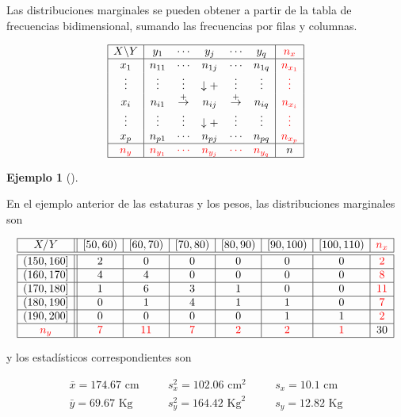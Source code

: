 \documentclass[
  spanish,
  a4paper,
]{scrreport}
\theoremstyle{plain}
\theoremstyle{definition}
\newtheorem{example}{Ejemplo}[chapter]
\theoremstyle{definition}
\theoremstyle{remark}
\begin{document}
Las distribuciones marginales se pueden obtener a partir de la tabla de
frecuencias bidimensional, sumando las frecuencias por filas y columnas.

\[
\begin{array}{|c|ccccc|c|}
\hline
X\backslash Y & y_1 & \cdots & y_j & \cdots & y_q & \color{red}{n_x}\\
\hline
x_1 & n_{11} & \cdots & n_{1j} & \cdots & n_{1q} & \color{red}{n_{x_1}}\\
\vdots & \vdots & \vdots & \downarrow + & \vdots & \vdots & \color{red}{\vdots} \\
x_i & n_{i1} & \stackrel{+}{\rightarrow} & n_{ij} & \stackrel{+}{\rightarrow} & n_{iq} & \color{red}{n_{x_i}}\\
\vdots & \vdots & \vdots & \downarrow +  & \vdots & \vdots & \color{red}{\vdots}\\
x_p & n_{p1} & \cdots & n_{pj} & \cdots & n_{pq} & \color{red}{n_{x_p}} \\
\hline
\color{red}{n_y} & \color{red}{n_{y_1}} & \color{red}{\cdots} & \color{red}{n_{y_j}} & \color{red}{\cdots} & \color{red}{n_{y_q}} & n\\
\hline
\end{array}
\]

\begin{example}[]\protect\hypertarget{exm-distribuciones-marginales}{}\label{exm-distribuciones-marginales}

En el ejemplo anterior de las estaturas y los pesos, las distribuciones
marginales son

\[
\begin{array}{|c||c|c|c|c|c|c|c|}
\hline
  X/Y & [50,60) & [60,70) & [70,80) & [80,90) & [90,100) & [100,110) & \color{red}{n_x}\\
  \hline\hline
  (150,160] & 2 & 0 & 0 & 0 & 0 & 0 & \color{red}{2}\\
  \hline
  (160,170] & 4 & 4 & 0 & 0 & 0 & 0 & \color{red}{8}\\
  \hline
  (170,180] & 1 & 6 & 3 & 1 & 0 & 0 & \color{red}{11} \\
  \hline
  (180,190] & 0 & 1 & 4 & 1 & 1 & 0 & \color{red}{7} \\
  \hline
  (190,200] & 0 & 0 & 0 & 0 & 1 & 1 & \color{red}{2}\\
  \hline
  \color{red}{n_y} & \color{red}{7} & \color{red}{11} & \color{red}{7} & \color{red}{2} & \color{red}{2} & \color{red}{1} & 30\\
  \hline
\end{array}
\]

y los estadísticos correspondientes son

\[
\begin{array}{lllll}
\bar x = 174.67 \mbox{ cm} & \quad & s^2_x = 102.06 \mbox{ cm}^2 & \quad & s_x = 10.1 \mbox{ cm}\\
\bar y = 69.67 \mbox{ Kg} & & s^2_y = 164.42 \mbox{ Kg}^2 & & s_y = 12.82 \mbox{ Kg}
\end{array}
\]

\end{example}
\end{document}
